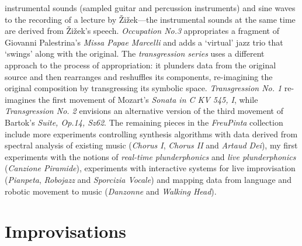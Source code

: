 instrumental sounds (sampled guitar and percussion instruments) and sine waves to the recording of a lecture by \v{Z}i\v{z}ek---the instrumental sounds at the same time are derived from \v{Z}i\v{z}ek's speech. \emph{Occupation No.3} appropriates a fragment of Giovanni Palestrina's \emph{Missa Papae Marcelli} and adds a `virtual' jazz trio that `swings' along with the original. The \emph{transgression series} uses a different approach to the process of appropriation: it plunders data from the original source and then rearranges and reshuffles its components, re-imagining the original composition by transgressing its symbolic space. \emph{Transgression No. 1} re-imagines the first movement of Mozart's \emph{Sonata in C KV 545, I}, while \emph{Transgression No. 2} envisions an alternative version of the third movement of Bartok's \emph{Suite, Op.14, Sz62}. The remaining pieces in the \emph{FreuPinta} collection include more experiments controlling synthesis algorithms with data derived from spectral analysis of existing music (\emph{Chorus I}, \emph{Chorus II} and \emph{Artaud Dei}), my first experiments with the notions of \emph{real-time plunderphonics} and \emph{live plunderphonics} (\emph{Canzione Piramide}), experiments with interactive systems for live improvisation (\emph{Pianpeta}, \emph{Robojazz} and \emph{Sporcizia Vocale}) and mapping data from language and robotic movement to music (\emph{Danzonne} and \emph{Walking Head}).

\section{Improvisations}

